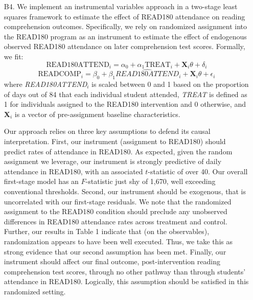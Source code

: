 \documentclass[a4paper, 11pt]{article}
\begin{document}
\begin{enumerate}
	\item[B4.] We implement an instrumental variables approach in a two-stage least squares framework to estimate the effect of READ180 attendance on reading comprehension outcomes. Specifically, we rely on randomized assignment into the READ180 program as an instrument to estimate the effect of endogenous observed READ180 attendance on later comprehension test scores. Formally, we fit:
	\begin{equation}
	\text{READ180ATTEND}_i = \alpha_0 + \alpha_1 \text{TREAT}_i + \textbf{X}_i \theta + \delta_i
	\end{equation}
	\begin{equation}
	\text{READCOMP}_i = \beta_0 + \beta_1 \hat{READ180ATTEND}_i + \textbf{X}_i \theta + \epsilon_i
	\end{equation}
	where \textit{READ180ATTEND}$_{i}$ is scaled between 0 and 1 based on the proportion of days out of 84 that each individual student attended, \textit{TREAT} is defined as 1 for individuals assigned to the READ180 intervention and 0 otherwise, and \textbf{X}$_{i}$ is a vector of pre-assignment baseline characteristics. 
	
	Our approach relies on three key assumptions to defend its causal interpretation. First, our instrument (assignment to READ180) should predict rates of attendance in READ180. As expected, given the random assignment we leverage, our instrument is strongly predictive of daily attendance in READ180, with an associated $t$-statistic of over 40. Our overall first-stage model has an $F$-statistic just shy of 1,670, well exceeding conventional thresholds. Second, our instrument should be exogenous, that is uncorrelated with our first-stage residuals. We note that the randomized assignment to the READ180 condition should preclude any unobserved differences in READ180 attendance rates across treatment and control. Further, our results in Table 1 indicate that (on the observables), randomization appears to have been well executed. Thus, we take this as strong evidence that our second assumption has been met. Finally, our instrument should affect our final outcome, post-intervention reading comprehension test scores, through no other pathway than through students' attendance in READ180. Logically, this assumption should be satisfied in this randomized setting.
	

\end{enumerate}
\end{document}
